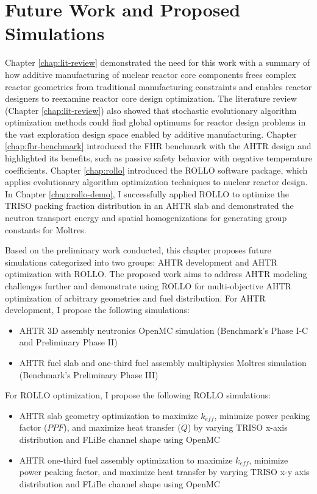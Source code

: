 \chapter{Future Work and Proposed Simulations}

Chapter \ref{chap:lit-review} demonstrated the need for this work with a summary
of how additive manufacturing of nuclear reactor core components frees complex 
reactor geometries from traditional manufacturing constraints and enables 
reactor designers to reexamine reactor core design optimization.
The literature review (Chapter \ref{chap:lit-review}) also showed that 
stochastic evolutionary algorithm optimization methods could find global 
optimums for reactor design problems in the vast exploration design space 
enabled by additive manufacturing. 
Chapter \ref{chap:fhr-benchmark} introduced the \acrfull{FHR} benchmark with 
the \gls{AHTR} design and highlighted its benefits, such as passive safety 
behavior with negative temperature coefficients. 
Chapter \ref{chap:rollo} introduced the \acrfull{ROLLO} software package, 
which applies evolutionary algorithm optimization techniques to nuclear 
reactor design. 
In Chapter \ref{chap:rollo-demo}, I successfully applied \gls{ROLLO} 
to optimize the \gls{TRISO} packing fraction distribution in an \gls{AHTR} slab
and demonstrated the neutron transport energy and spatial homogenizations for 
generating group constants for Moltres. 

Based on the preliminary work conducted, this chapter proposes 
future simulations categorized into two groups: \gls{AHTR} development and 
\gls{AHTR} optimization with \gls{ROLLO}. 
The proposed work aims to address \gls{AHTR} modeling challenges further and 
demonstrate using \gls{ROLLO} for multi-objective \gls{AHTR} 
optimization of arbitrary geometries and fuel distribution. 
For \gls{AHTR} development, I propose the following simulations: 
\begin{itemize}
    \item \gls{AHTR} 3D assembly neutronics OpenMC simulation (Benchmark's Phase I-C and 
    Preliminary Phase II)
    \item \gls{AHTR} fuel slab and one-third fuel assembly multiphysics 
    Moltres simulation (Benchmark's Preliminary Phase III)
\end{itemize}
For \gls{ROLLO} optimization, I propose the following \gls{ROLLO} simulations: 
\begin{itemize}
    \item \gls{AHTR} slab geometry optimization to maximize $k_{eff}$, 
    minimize power peaking factor ($PPF$), and maximize heat transfer ($\dot{Q}$) 
    by varying \gls{TRISO} x-axis distribution and \gls{FLiBe} channel shape using OpenMC
    \item \gls{AHTR} one-third fuel assembly optimization to maximize $k_{eff}$, 
    minimize power peaking factor, and maximize heat transfer by varying \gls{TRISO} 
    x-y axis distribution and \gls{FLiBe} channel shape using OpenMC
\end{itemize}

